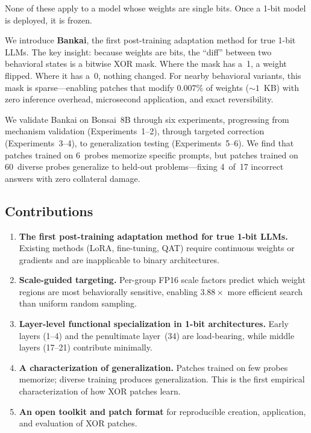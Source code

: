 \documentclass[11pt,a4paper]{article}
\begin{document}
None of these apply to a model whose weights are single bits. Once a 1-bit
model is deployed, it is frozen.

We introduce \textbf{Bankai}, the first post-training adaptation method
for true 1-bit LLMs. The key insight: because weights are bits, the
``diff'' between two behavioral states is a bitwise XOR mask. Where the
mask has a~1, a weight flipped. Where it has a~0, nothing changed. For
nearby behavioral variants, this mask is sparse---enabling patches that
modify $0.007\%$ of weights (${\sim}1$~KB) with zero inference overhead,
microsecond application, and exact reversibility.

We validate Bankai on Bonsai~8B through six experiments, progressing from
mechanism validation (Experiments~1--2), through targeted correction
(Experiments~3--4), to generalization testing (Experiments~5--6). We find
that patches trained on 6~probes memorize specific prompts, but patches
trained on 60~diverse probes generalize to held-out problems---fixing
4~of~17 incorrect answers with zero collateral damage.

\subsection{Contributions}

\begin{enumerate}[nosep]
  \item \textbf{The first post-training adaptation method for true 1-bit
    LLMs.} Existing methods (LoRA, fine-tuning, QAT) require continuous
    weights or gradients and are inapplicable to binary architectures.
  \item \textbf{Scale-guided targeting.} Per-group FP16 scale factors
    predict which weight regions are most behaviorally sensitive, enabling
    $3.88\times$ more efficient search than uniform random sampling.
  \item \textbf{Layer-level functional specialization in 1-bit
    architectures.} Early layers (1--4) and the penultimate layer~(34)
    are load-bearing, while middle layers (17--21) contribute minimally.
  \item \textbf{A characterization of generalization.} Patches trained on
    few probes memorize; diverse training produces generalization. This
    is the first empirical characterization of how XOR patches learn.
  \item \textbf{An open toolkit and patch format} for reproducible
    creation, application, and evaluation of XOR patches.
\end{enumerate}
\end{document}
